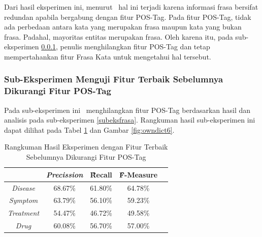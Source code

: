 	Dari hasil eksperimen ini, menurut \saya~hal ini terjadi karena informasi frasa bersifat redundan apabila bergabung dengan fitur POS-Tag. Pada fitur POS-Tag, tidak ada perbedaan antara kata yang merupakan frasa maupun kata yang bukan frasa. Padahal, mayoritas entitas merupakan frasa. Oleh karena itu, pada sub-eksperimen \ref{eks:subeksminpostag}, penulis menghilangkan fitur POS-Tag dan tetap mempertahankan fitur Frasa Kata untuk mengetahui hal tersebut. 
	
	\subsubsection{Sub-Eksperimen Menguji Fitur Terbaik Sebelumnya Dikurangi Fitur POS-Tag}\label{eks:subeksminpostag}
	Pada sub-eksperimen ini \saya~menghilangkan fitur POS-Tag berdasarkan hasil dan analisis pada sub-eksperimen \ref{subeksfrasa}. Rangkuman hasil sub-eksperimen ini dapat dilihat pada Tabel \ref{table:owndict6} dan Gambar \ref{fig:owndict6}.
	
	\begin{table}
		\centering
		\caption{Rangkuman Hasil Eksperimen dengan Fitur Terbaik Sebelumnya Dikurangi Fitur POS-Tag}
		\begin{tabular}{|c|c|c|c|c|}
			\hline
			                      & \textit{Precission} & \f{\f{Recall}} & \f{\f{F-Measure}} \\ \hline
			\textit{Disease}      & 68.67\%             & 61.80\%        & 64.78\%           \\ \hline
			\textit{Symptom}      & 63.79\%             & 56.10\%        & 59.23\%           \\ \hline
			\textit{Treatment}    & 54.47\%             & 46.72\%        & 49.58\%           \\ \hline
			\textit{Drug}		  & 60.08\%             & 56.70\%        & 57.00\%           \\ \hline
		\end{tabular}
		\label{table:owndict6}
	\end{table}
	
